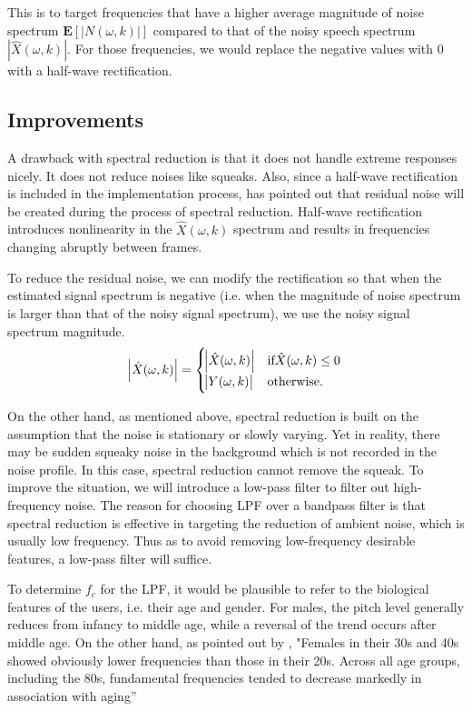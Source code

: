 This is to target frequencies that have a higher average magnitude of noise spectrum $\textbf{E}[|N(\omega,k)|]$ compared to that of 
the noisy speech spectrum $|\hat{X}(\omega,k)|$. For those frequencies, we would replace the negative values with 0 with a half-wave 
rectification.

\subsection{Improvements}
A drawback with spectral reduction is that it does not handle extreme responses nicely. It does not reduce noises like
squeaks. Also, since a half-wave rectification is included in the implementation process, \cite{spectral_drawback} has 
pointed out that residual noise will be created during the process of spectral reduction. Half-wave rectification introduces
nonlinearity in the $\hat{X}(\omega,k)$ spectrum and results in frequencies changing abruptly between frames.

To reduce the residual noise, we can modify the rectification so that when the estimated 
signal spectrum is negative (i.e. when the magnitude of noise spectrum is larger than that of the 
noisy signal spectrum), we use the noisy signal spectrum magnitude.
\begin{equation}
    \abs{\hat{X}(\omega,k)} = \begin{cases}
        \abs{\hat{X}(\omega,k)}   & \text{if} \hat{X}(\omega,k) \leq 0\\
        \abs{Y(\omega,k)}                   & \text{otherwise.}
    \end{cases}
\end{equation}

On the other hand, as mentioned above, spectral reduction is built on the assumption that the noise is stationary or slowly varying. Yet in reality,
there may be sudden squeaky noise in the background which is not recorded in the noise profile. In this case, spectral reduction 
cannot remove the squeak. To improve the situation, we will introduce a low-pass filter to filter out high-frequency noise. The reason
for choosing LPF over a bandpass filter is that spectral reduction is effective in targeting the reduction of ambient noise, which is
 usually low frequency. Thus as to avoid removing low-frequency desirable features, a low-pass filter will suffice.

To determine $f_c$ for the LPF, it would be plausible to refer to the biological features of the users, i.e. their age and gender.
For males, the pitch level generally reduces from infancy to middle age, while a reversal of the trend occurs after middle age. 
On the other hand, as pointed out by \cite{womenprange}, "Females in their 30s and 40s showed obviously lower frequencies than those in their
20s. Across all age groups, including the 80s, fundamental frequencies tended to decrease markedly in association with aging”

